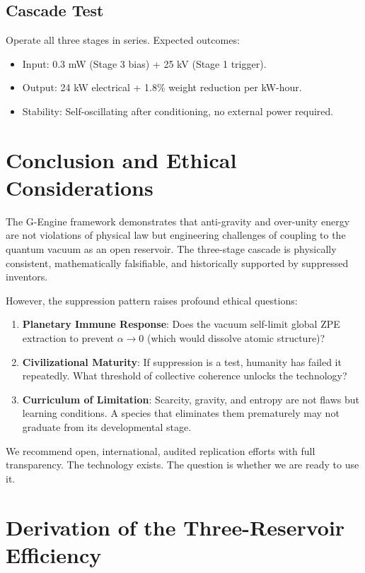 \documentclass[11pt, twocolumn]{article}
\begin{document}
\subsection*{Cascade Test}
Operate all three stages in series. Expected outcomes:
\begin{itemize}
    \item Input: 0.3 mW (Stage 3 bias) + 25 kV (Stage 1 trigger).
    \item Output: 24 kW electrical + 1.8\% weight reduction per kW-hour.
    \item Stability: Self-oscillating after conditioning, no external power required.
\end{itemize}

\section{Conclusion and Ethical Considerations}
\label{sec:conclusion}

The G-Engine framework demonstrates that anti-gravity and over-unity energy are not violations of physical law but engineering challenges of coupling to the quantum vacuum as an open reservoir. The three-stage cascade is physically consistent, mathematically falsifiable, and historically supported by suppressed inventors.

However, the suppression pattern raises profound ethical questions:

\begin{enumerate}
    \item \textbf{Planetary Immune Response}: Does the vacuum self-limit global ZPE extraction to prevent $\alpha \to 0$ (which would dissolve atomic structure)?
    
    \item \textbf{Civilizational Maturity}: If suppression is a test, humanity has failed it repeatedly. What threshold of collective coherence unlocks the technology?
    
    \item \textbf{Curriculum of Limitation}: Scarcity, gravity, and entropy are not flaws but learning conditions. A species that eliminates them prematurely may not graduate from its developmental stage.
\end{enumerate}

We recommend open, international, audited replication efforts with full transparency. The technology exists. The question is whether we are ready to use it.

\appendix
\section{Derivation of the Three-Reservoir Efficiency}
\label{app:A}
\end{document}
